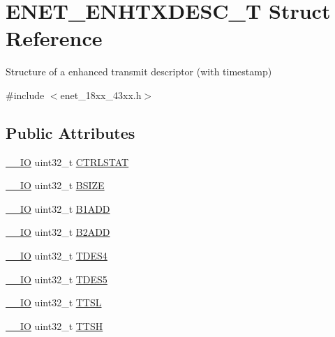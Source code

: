\hypertarget{struct_e_n_e_t___e_n_h_t_x_d_e_s_c___t}{}\section{E\+N\+E\+T\+\_\+\+E\+N\+H\+T\+X\+D\+E\+S\+C\+\_\+T Struct Reference}
\label{struct_e_n_e_t___e_n_h_t_x_d_e_s_c___t}


Structure of a enhanced transmit descriptor (with timestamp)  




{\ttfamily \#include $<$enet\+\_\+18xx\+\_\+43xx.\+h$>$}

\subsection*{Public Attributes}
\begin{DoxyCompactItemize}
\item 
\hyperlink{core__sc300_8h_aec43007d9998a0a0e01faede4133d6be}{\+\_\+\+\_\+\+IO} uint32\+\_\+t \hyperlink{struct_e_n_e_t___e_n_h_t_x_d_e_s_c___t_ad108a942a27021fb33bbb83261d30409}{C\+T\+R\+L\+S\+T\+AT}
\item 
\hyperlink{core__sc300_8h_aec43007d9998a0a0e01faede4133d6be}{\+\_\+\+\_\+\+IO} uint32\+\_\+t \hyperlink{struct_e_n_e_t___e_n_h_t_x_d_e_s_c___t_abb8c8325ee32111907d414b8155c806e}{B\+S\+I\+ZE}
\item 
\hyperlink{core__sc300_8h_aec43007d9998a0a0e01faede4133d6be}{\+\_\+\+\_\+\+IO} uint32\+\_\+t \hyperlink{struct_e_n_e_t___e_n_h_t_x_d_e_s_c___t_a1bdd8dec5a29c128809935c26f96c803}{B1\+A\+DD}
\item 
\hyperlink{core__sc300_8h_aec43007d9998a0a0e01faede4133d6be}{\+\_\+\+\_\+\+IO} uint32\+\_\+t \hyperlink{struct_e_n_e_t___e_n_h_t_x_d_e_s_c___t_a12208c6552e8a31b9e350d571212aafd}{B2\+A\+DD}
\item 
\hyperlink{core__sc300_8h_aec43007d9998a0a0e01faede4133d6be}{\+\_\+\+\_\+\+IO} uint32\+\_\+t \hyperlink{struct_e_n_e_t___e_n_h_t_x_d_e_s_c___t_a13af1cbd14a93f32fb382c83eca82209}{T\+D\+E\+S4}
\item 
\hyperlink{core__sc300_8h_aec43007d9998a0a0e01faede4133d6be}{\+\_\+\+\_\+\+IO} uint32\+\_\+t \hyperlink{struct_e_n_e_t___e_n_h_t_x_d_e_s_c___t_a29502d0eaea16c50f92a30f6baacf3d7}{T\+D\+E\+S5}
\item 
\hyperlink{core__sc300_8h_aec43007d9998a0a0e01faede4133d6be}{\+\_\+\+\_\+\+IO} uint32\+\_\+t \hyperlink{struct_e_n_e_t___e_n_h_t_x_d_e_s_c___t_ad37c5852ed8a2168db4f2f0962d5213c}{T\+T\+SL}
\item 
\hyperlink{core__sc300_8h_aec43007d9998a0a0e01faede4133d6be}{\+\_\+\+\_\+\+IO} uint32\+\_\+t \hyperlink{struct_e_n_e_t___e_n_h_t_x_d_e_s_c___t_a8225712b45fa04875a253796c53256b7}{T\+T\+SH}
\end{DoxyCompactItemize}


